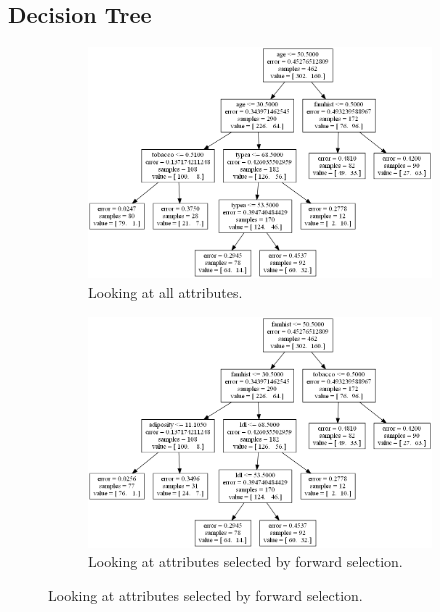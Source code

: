 \subsection{Decision Tree}

\begin{figure}
	\begin{subfigure}[b]{0.5\textwidth}
	\includegraphics[scale=0.4]{pictures/Decision_Tree_X.png}
	\caption{Looking at all attributes.}
	\label{decisionTreeX}
	\end{subfigure}
	\begin{subfigure}[b]{0.5\textwidth}
	\includegraphics[scale=0.4]{pictures/Decision_Tree_Xad.png}	
	\caption{Looking at attributes selected by forward selection.}
	\label{decisionTreeXad}
	\end{subfigure}


\end{figure}
